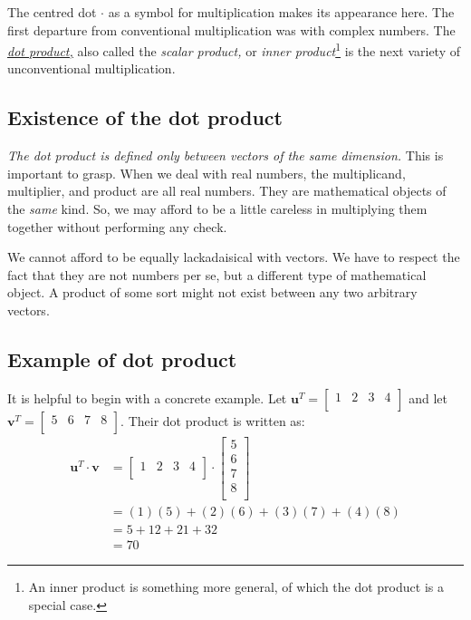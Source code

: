 \documentclass[
  a4paper,
]{article}
\begin{document}
The centred dot \(\cdot\) as a symbol for multiplication makes its
appearance here. The first departure from conventional multiplication
was with complex numbers. The
\href{https://en.wikipedia.org/wiki/Dot_product}{\emph{dot product,}}
also called the \emph{scalar product,} or \emph{inner
product}\footnote{An inner product is something more general, of which
  the dot product is a special case.} is the next variety of
unconventional multiplication.

\hypertarget{existence-of-the-dot-product}{%
\subsection{Existence of the dot
product}\label{existence-of-the-dot-product}}

\emph{The dot product is defined only between vectors of the same
dimension.} This is important to grasp. When we deal with real numbers,
the multiplicand, multiplier, and product are all real numbers. They are
mathematical objects of the \emph{same} kind. So, we may afford to be a
little careless in multiplying them together without performing any
check.

We cannot afford to be equally lackadaisical with vectors. We have to
respect the fact that they are not numbers per se, but a different type
of mathematical object. A product of some sort might not exist between
any two arbitrary vectors.

\hypertarget{example-of-dot-product}{%
\subsection{Example of dot product}\label{example-of-dot-product}}

It is helpful to begin with a concrete example. Let
\(\symbf{u}^{T} = \begin{bmatrix}1&2&3&4\\\end{bmatrix}\) and let
\(\symbf{v}^{T} = \begin{bmatrix}5&6&7&8\\\end{bmatrix}\). Their dot
product is written as: \[
\begin{aligned}
\symbf{u}^{T}\cdot\symbf{v} &= \begin{bmatrix}1&2&3&4\\\end{bmatrix} \cdot \begin{bmatrix} 5\\6\\7\\8\\ \end{bmatrix}\\
&= (1)(5) + (2)(6) + (3)(7) + (4)(8)\\
&= 5 + 12 + 21 + 32\\
&= 70
\end{aligned}
\]
\end{document}
